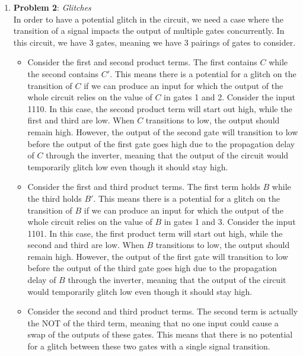 \documentclass{article}
\begin{document}
\begin{enumerate}
        \item \textbf{Problem 2}: \emph{Glitches} \\
            
            In order to have a potential glitch in the circuit, we need a case
            where the transition of a signal impacts the output of multiple
            gates concurrently. In this circuit, we have 3 gates, meaning we
            have 3 pairings of gates to consider.

            \begin{itemize}
                \item Consider the first and second product terms. The first
                contains $C$ while the second contains $C'$. This means there
                is a potential for a glitch on the transition of $C$ if we can 
                produce an input for which the output of the whole circuit
                relies on the value of $C$ in gates 1 and 2. Consider the input 
                1110. In this case, the second product term will start out high,
                while the first and third are low. When $C$ transitions to low, 
                the output should remain high. However, the output of the second 
                gate will transition to low before the output of the first gate
                goes high due to the propagation delay of $C$ through the
                inverter, meaning that the output of the circuit would
                temporarily glitch low even though it should stay high.
                \item Consider the first and third product terms. The first term
                holds $B$ while the third holds $B'$. This means there is a
                potential for a glitch on the transition of $B$ if we can
                produce an input for which the output of the whole circuit
                relies on the value of $B$ in gates 1 and 3. Consider the input
                1101. In this case, the first product term will start out high,
                while the second and third are low. When $B$ transitions to low,
                the output should remain high. However, the output of the first
                gate will transition to low before the output of the third gate
                goes high due to the propagation delay of $B$ through the
                inverter, meaning that the output of the circuit would
                temporarily glitch low even though it should stay high.
                \item Consider the second and third product terms. The second 
                term is actually the NOT of the third term, meaning that no one 
                input could cause a swap of the outputs of these gates. This
                means that there is no potential for a glitch between these two 
                gates with a single signal transition.


\end{itemize}
\end{enumerate}
\end{document}
